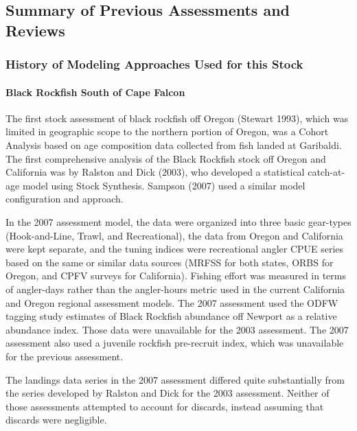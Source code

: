 \documentclass[11pt,
  english,
  letterpaper,
]{article}
\begin{document}
\hypertarget{summary-of-previous-assessments-and-reviews}{%
\subsection{Summary of Previous Assessments and Reviews}\label{summary-of-previous-assessments-and-reviews}}

\hypertarget{history-of-modeling-approaches-used-for-this-stock}{%
\subsubsection{History of Modeling Approaches Used for this Stock}\label{history-of-modeling-approaches-used-for-this-stock}}

\hypertarget{black-rockfish-south-of-cape-falcon}{%
\paragraph{Black Rockfish South of Cape Falcon}\label{black-rockfish-south-of-cape-falcon}}

The first stock assessment of black rockfish off Oregon (Stewart 1993), which was limited in geographic scope to the northern portion of Oregon, was a Cohort Analysis based on age composition data collected from fish landed at Garibaldi. The first comprehensive analysis of the Black Rockfish stock off Oregon and California was by Ralston and Dick (2003), who developed a statistical catch-at-age model using Stock Synthesis. Sampson (2007) used a similar model configuration and approach.

In the 2007 assessment model, the data were organized into three basic gear-types (Hook-and-Line, Trawl, and Recreational), the data from Oregon and California were kept separate, and the tuning indices were recreational angler CPUE series based on the same or similar data sources (MRFSS for both states, ORBS for Oregon, and CPFV surveys for California). Fishing effort was measured in terms of angler-days rather than the angler-hours metric used in the current California and Oregon regional assessment models. The 2007 assessment used the ODFW tagging study estimates of Black Rockfish abundance off Newport as a relative abundance index. Those data were unavailable for the 2003 assessment. The 2007 assessment also used a juvenile rockfish pre-recruit index, which was unavailable for the previous assessment.

The landings data series in the 2007 assessment differed quite substantially from the series developed by Ralston and Dick for the 2003 assessment. Neither of those assessments attempted to account for discards, instead assuming that discards were negligible.
\end{document}
